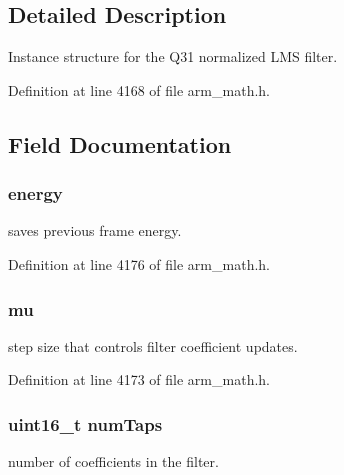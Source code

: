 \subsection{Detailed Description}
Instance structure for the Q31 normalized L\+MS filter. 

Definition at line 4168 of file arm\+\_\+math.\+h.



\subsection{Field Documentation}
\subsubsection[{\texorpdfstring{energy}{energy}}]{ energy}\hypertarget{structarm__lms__norm__instance__q31_a012fee0f71095d2557bb633e73ef7355}{}\label{structarm__lms__norm__instance__q31_a012fee0f71095d2557bb633e73ef7355}
saves previous frame energy. 

Definition at line 4176 of file arm\+\_\+math.\+h.

\subsubsection[{\texorpdfstring{mu}{mu}}]{ mu}\hypertarget{structarm__lms__norm__instance__q31_a21ab4237a726ea7751f5026d89d2e577}{}\label{structarm__lms__norm__instance__q31_a21ab4237a726ea7751f5026d89d2e577}
step size that controls filter coefficient updates. 

Definition at line 4173 of file arm\+\_\+math.\+h.

\subsubsection[{\texorpdfstring{num\+Taps}{numTaps}}]{\setlength{\rightskip}{0pt plus 5cm}uint16\+\_\+t num\+Taps}\hypertarget{structarm__lms__norm__instance__q31_a751941891e47f522a7f5375fe8990aac}{}\label{structarm__lms__norm__instance__q31_a751941891e47f522a7f5375fe8990aac}
number of coefficients in the filter. 

